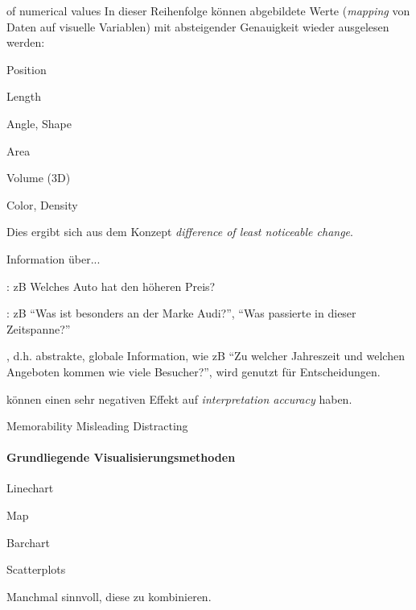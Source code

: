 \documentclass[10pt]{article} %
\begin{document}
\begin{definition} of numerical values
  In dieser Reihenfolge können abgebildete Werte (\textit{mapping} von Daten auf
  visuelle Variablen) mit absteigender Genauigkeit wieder ausgelesen werden:
  \begin{cptenumerate}
  \item Position
  \item Length
  \item Angle, Shape
  \item Area
  \item Volume (3D)
  \item Color, Density
  \end{cptenumerate}
  Dies ergibt sich aus dem Konzept \textit{difference of least noticeable change}.
\end{definition}

\begin{definition}
  Information über...
  \begin{cptenumerate}
    \item {}: zB Welches Auto hat den
      höheren Preis?
    \item {}: zB ``Was ist besonders an der
      Marke Audi?'', ``Was passierte in dieser Zeitspanne?''
    \item {}, d.h. abstrakte, globale Information, wie
      zB ``Zu welcher Jahreszeit und welchen Angeboten kommen wie viele
      Besucher?'', wird genutzt für Entscheidungen.
  \end{cptenumerate}
\end{definition}

\begin{definition}[Embellishments]
  können einen sehr negativen Effekt auf \textit{interpretation accuracy} haben.
  \begin{cptitemize}
    \advantageit Memorability
    \disadvantageit Misleading
    \disadvantageit Distracting
  \end{cptitemize}
\end{definition}

\paragraph{Grundliegende Visualisierungsmethoden} 
\begin{cptitemize} 
\item Linechart
\item Map
\item Barchart
\item Scatterplots
\end{cptitemize} 
Manchmal sinnvoll, diese zu kombinieren.
\end{document}
